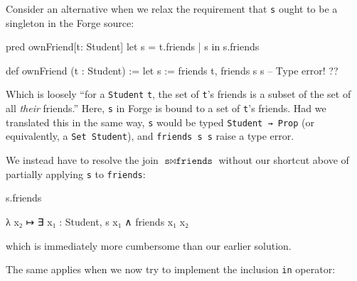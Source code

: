 Consider an alternative when we relax the requirement that \texttt{s} ought to be a singleton in the Forge source: 

\vspace{0.5em}
\noindent\begin{minipage}{0.5\textwidth}
\begin{forge*}
pred ownFriend[t: Student] {
  let s = t.friends |
    s in s.friends
}
\end{forge*}
\end{minipage}%
\begin{minipage}{0.5\textwidth}
\begin{lean*}
def ownFriend (t : Student) := 
  let s := friends t, 
    friends s s -- Type error!
?\phantom{}?
\end{lean*}
\end{minipage}
\vspace{0.5em}\newline
Which is loosely ``for a \texttt{Student} \texttt{t}, the set of \texttt{t}'s friends is a subset of the set of all \emph{their} friends.'' Here, \texttt{s} in Forge is bound to a set of \texttt{t}'s friends. Had we translated this in the same way, \texttt{s} would be typed \texttt{Student → Prop} (or equivalently, a \texttt{Set Student}), and \texttt{friends s s} raise a type error. 

We instead have to resolve the join $\texttt{s} \bowtie \texttt{friends}$ without our shortcut above of partially applying \texttt{s} to \texttt{friends}: 

\vspace{0.5em}
\noindent\begin{minipage}{0.3\textwidth}
\begin{forge*}
s.friends
\end{forge*}
\end{minipage}%
\begin{minipage}{0.7\textwidth}
\begin{lean*}
λ x₂ ↦ ∃ x₁ : Student, s x₁ ∧ friends x₁ x₂
\end{lean*}
\end{minipage}
\vspace{0.5em}\newline
which is immediately more cumbersome than our earlier solution. 

The same applies when we now try to implement the inclusion \texttt{in} operator: 

